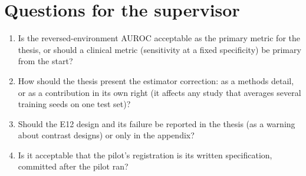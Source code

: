 \section{Questions for the supervisor}
\begin{enumerate}\itemsep1pt
\item Is the reversed-environment AUROC acceptable as the primary metric for the thesis, or should a clinical metric
(sensitivity at a fixed specificity) be primary from the start?
\item How should the thesis present the estimator correction: as a methods detail, or as a contribution in its own
right (it affects any study that averages several training seeds on one test set)?
\item Should the E12 design and its failure be reported in the thesis (as a warning about contrast designs) or only in
the appendix?
\item Is it acceptable that the pilot's registration is its written specification, committed after the pilot ran?
\end{enumerate}




